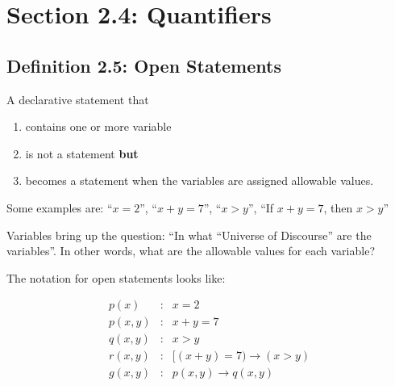 \documentclass{article}
\begin{document}
\section*{Section 2.4: Quantifiers}

\subsection*{Definition 2.5: Open Statements}

A declarative statement that

\begin{enumerate}
\item contains one or more variable
\item is not a statement \textbf{but}
\item becomes a statement when the variables are assigned allowable
  values.
\end{enumerate}

Some examples are: ``$x=2$'', ``$x+y=7$'', ``$x>y$'', ``If $x+y=7$,
then $x>y$''

Variables bring up the question: ``In what ``Universe of Discourse''
are the variables''. In other words, what are the allowable values for
each variable?

The notation for open statements looks like:

\[
\begin{array}{rcl}
p(x) & : & x=2 \\
p(x,y) & : & x+y=7 \\
q(x,y) & : & x>y \\
r(x,y) & : & \lbrack(x+y)=7)\rightarrow(x>y) \\
g(x,y) & : & p(x,y)\rightarrow{}q(x,y) \\
\end{array}
\]
\end{document}
